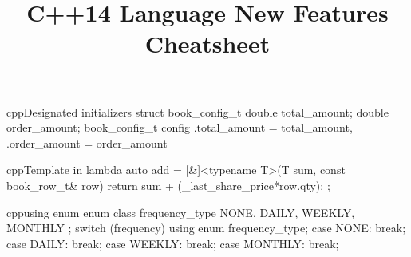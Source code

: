 \documentclass[10pt,a4paper]{article}
\title{\color{w3schools}C++14 Language New Features Cheatsheet
}
\begin{document}
\maketitle

\small
\begin{multicols}{3}

\thispagestyle{empty}
\scriptsize



\begin{codebox}{cpp}{Designated initializers}
struct book_config_t {
  double total_amount;
  double order_amount;
}
book_config_t config {
 .total_amount = total_amount,
 .order_amount = order_amount
}

\end{codebox}

\begin{codebox}{cpp}{Template in lambda}
auto add = [&]<typename T>(T sum,
                           const book_row_t& row)
{ return sum + (_last_share_price*row.qty); };

\end{codebox}

\begin{codebox}{cpp}{using enum}
enum class frequency_type {
  NONE,
  DAILY,
  WEEKLY,
  MONTHLY
};
switch (frequency) {
  using enum frequency_type;
  {
    case NONE: break;
    case DAILY: break;
    case WEEKLY: break;
    case MONTHLY: break;
  }
}

\end{codebox}


\AtNextBibliography{\footnotesize}
\printbibliography  
\end{multicols}
\end{document}
